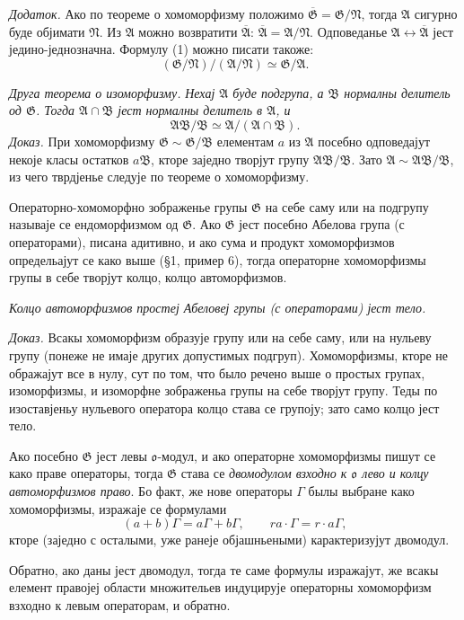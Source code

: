 ﻿\documentclass[11pt]{article}
\providecommand{\mG}{\mathfrak{G}}
\providecommand{\mA}{\mathfrak{A}}
\providecommand{\mB}{\mathfrak{B}}
\providecommand{\mN}{\mathfrak{N}}
\providecommand{\mo}{\mathfrak{o}}
\begin{document}
\emph{Додаток.} Ако по теореме о хомоморфизму положимо $\overline{\mG}=\mG/\mN$, тогда $\mA$ сигурно буде објимати $\mN$. Из $\mA$ можно возвратити $\overline{\mA}$: $\overline{\mA}=\mA/\mN$. Одповеданье $\mA\leftrightarrow\overline{\mA}$ јест једино-једнозначна. Формулу (1) можно писати такоже:
\[
        (\mG/\mN)/(\mA/\mN)\simeq \mG/\mA.
\]

\emph{Друга теорема о изоморфизму.} \emph{Нехај $\mA$ буде подгрупа, а $\mB$ нормалны делитель од $\mG$. Тогда $\mA\cap\mB$ јест нормалны делитель в $\mA$, и}
\[
        \mA\mB/\mB\simeq \mA/(\mA\cap\mB).
\]
\emph{Доказ.} При хомоморфизму $\mG\sim\mG/\mB$ елементам $a$ из $\mA$ посебно одповедајут некоје класы остатков $a\mB$, кторе заједно творјут групу $\mA\mB/\mB$. Зато $\mA\sim\mA\mB/\mB$, из чего тврдјенье следује по теореме о хомоморфизму.

Операторно-хомоморфно зображенье групы $\mG$ на себе саму или на подгрупу называје се ендоморфизмом од $\mG$. Ако $\mG$ јест посебно Абелова група (с операторами), писана адитивно, и ако сума и продукт хомоморфизмов определьајут се како выше (§1, пример 6), тогда операторне хомоморфизмы групы в себе творјут колцо, колцо автоморфизмов.

\emph{Колцо автоморфизмов простеј Абеловеј групы (с операторами) јест тело.}

\emph{Доказ.} Всакы хомоморфизм образује групу или на себе саму, или на нульеву групу (понеже не имаје других допустимых подгруп). Хомоморфизмы, кторе не ображајут все в нулу, сут по том, что было речено выше о простых групах, изоморфизмы, и изоморфне зображеньа групы на себе творјут групу. Теды по изоставјеньу нульевого оператора колцо става се групоју; зато само колцо јест тело.

Ако посебно $\mG$ јест левы $\mo$-модул, и ако операторне хомоморфизмы пишут се како праве операторы, тогда $\mG$ става се \emph{двомодулом взходно к $\mo$ лево и колцу автоморфизмов право}. Бо факт, же нове операторы $\Gamma$ былы выбране како хомоморфизмы, изражаје се формулами
\[
        (a+b)\Gamma=a\Gamma+b\Gamma,
        \qquad ra\cdot\Gamma=r\cdot a\Gamma,
\]
кторе (заједно с осталыми, уже ранеје објашньеными) карактеризујут двомодул.

Обратно, ако даны јест двомодул, тогда те саме формулы изражајут, же всакы елемент правојеј области множительев индуцирује операторны хомоморфизм взходно к левым операторам, и обратно.
\end{document}
